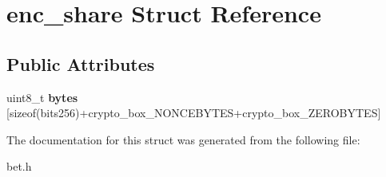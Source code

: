 \hypertarget{structenc__share}{}\section{enc\+\_\+share Struct Reference}
\label{structenc__share}
\subsection*{Public Attributes}
\begin{DoxyCompactItemize}
\item 
\mbox{\label{structenc__share_a4bac0ffac6bcc7a207ef17db51b8c471}} 
uint8\+\_\+t {\bfseries bytes} \mbox{[}sizeof(bits256)+crypto\+\_\+box\+\_\+\+N\+O\+N\+C\+E\+B\+Y\+T\+ES+crypto\+\_\+box\+\_\+\+Z\+E\+R\+O\+B\+Y\+T\+ES\mbox{]}
\end{DoxyCompactItemize}


The documentation for this struct was generated from the following file\+:\begin{DoxyCompactItemize}
\item 
bet.\+h\end{DoxyCompactItemize}
